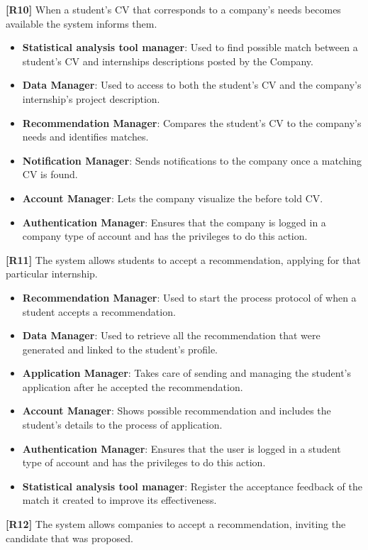 \textbf{[R10]} When a student's CV that corresponds to a company's needs becomes available the system informs them. 
\begin{itemize}
     \item \textbf{Statistical analysis tool manager}: Used to find possible match between a student's CV and internships descriptions posted by the Company.
     \item \textbf{Data Manager}: Used to access to both the student's CV and the company's internship's project description.
    \item \textbf{Recommendation Manager}: Compares the student's CV to the company's needs and identifies matches.
    \item \textbf{Notification Manager}: Sends notifications to the company once a matching CV is found.
    \item \textbf{Account Manager}: Lets the company visualize the before told CV.
    \item \textbf{Authentication Manager}: Ensures that the company is logged in a company type of account and has the privileges to do this action. 
\end{itemize}
\textbf{[R11]} The system allows students to accept a recommendation, applying for that particular internship. 
\begin{itemize}
    \item \textbf{Recommendation Manager}: Used to start the process protocol of when a student accepts a recommendation.
    \item \textbf{Data Manager}: Used to retrieve all the recommendation that were generated and linked to the student's profile.
    \item \textbf{Application Manager}: Takes care of sending and managing the student's application after he accepted the recommendation. 
    \item \textbf{Account Manager}: Shows possible recommendation and includes the student's details to the process of application.
    \item \textbf{Authentication Manager}: Ensures that the user is logged in a student type of account and has the privileges to do this action. 
    \item \textbf{Statistical analysis tool manager}: Register the acceptance feedback of the match it created to improve its effectiveness.
\end{itemize}
\textbf{[R12]} The system allows companies to accept a recommendation, inviting the candidate that was proposed.
